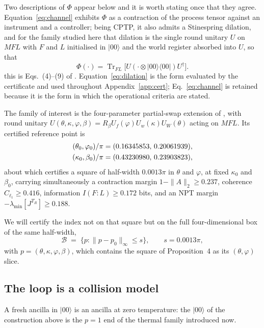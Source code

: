 \documentclass[11pt,a4paper]{article}
\theoremstyle{definition}
\theoremstyle{remark}
\DeclareMathOperator{\Tr}{Tr}
\providecommand{\ket}[1]{|#1\rangle}
\providecommand{\bra}[1]{\langle#1|}
\begin{document}
Two descriptions of $\Phi$ appear below and it is worth stating once that they
agree. Equation~\eqref{eq:channel} exhibits $\Phi$ as a contraction of the
process tensor against an instrument and a controller; being CPTP, it also
admits a Stinespring dilation, and for the family studied here that dilation is
the single round unitary $U$ on $MFL$ with $F$ and $L$ initialised in
$\ket{00}$ and the world register absorbed into $U$, so that
\begin{equation}\label{eq:dilation}
  \Phi(\cdot)=\Tr_{FL}\bigl[U(\cdot\otimes\ket{00}\bra{00})U^{\dagger}\bigr].
\end{equation}
this is Eqs.~(4)--(9) of \cite[Sec.~IV]{PaperI}.
Equation~\eqref{eq:dilation} is the form evaluated by the certificate and used
throughout Appendix~\ref{app:cert}; Eq.~\eqref{eq:channel} is retained because
it is the form in which the operational criteria are stated.

The family of interest is the four-parameter partial-swap extension of
\cite[Sec.~VI]{PaperI}, with round unitary
$U(\theta,\kappa,\varphi,\beta)=R_{\beta}U_{f}(\varphi)U_{w}(\kappa)U_{W}(\theta)$
acting on $MFL$. Its certified reference point is
\begin{align}\label{eq:refpoint}
  (\theta_{0},\varphi_{0})/\pi &= (0.16345853,\,0.20061939),\notag\\
  (\kappa_{0},\beta_{0})/\pi &= (0.43230980,\,0.23903823),
\end{align}
about which \cite[Prop.~4]{PaperI} certifies a square of half-width
$0.0013\pi$ in $\theta$ and $\varphi$, at fixed $\kappa_{0}$ and $\beta_{0}$,
carrying simultaneously a contraction margin $1-\|A\|_{2}\ge0.237$, coherence
$C_{\ell_{1}}\ge0.416$, information $I(F{:}L)\ge0.172$ bits, and an NPT margin
$-\lambda_{\min}[J^{T_{R}}]\ge0.188$.

We will certify the index not on that square but on the full four-dimensional
box of the same half-width,
\begin{equation}\label{eq:box}
  \mathcal{B}\;=\;\bigl\{p:\|p-p_{0}\|_{\infty}\le s\bigr\},\qquad
  s=0.0013\pi,
\end{equation}
with $p=(\theta,\kappa,\varphi,\beta)$, which contains the square of
Proposition~4 as its $(\theta,\varphi)$ slice.


\subsection{The loop is a collision model}

A fresh ancilla in $\ket{00}$ is an ancilla at zero temperature: the
$\ket{00}$ of the construction above is the $p=1$ end of the thermal family
introduced now.
\end{document}
